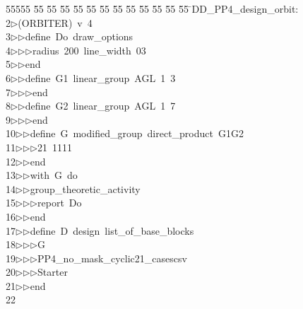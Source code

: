%
%
\begin{tabbing}
55555 \= 55 \= 55 \= 55 \= 55 \= 55 \= 55 \= 55 \= 55 \= 55 \= 55 \= 55 \= 55 \= \>DD\_PP4\_design\_orbit:\\[0pt]
2\>$\triangleright$\>(ORBITER)\ v\ 4\ \\[0pt]
3\>$\triangleright$\>$\triangleright$\>define\ Do\ draw\_options\ \\[0pt]
4\>$\triangleright$\>$\triangleright$\>$\triangleright$\>radius\ 200\ line\_width\ 03\ \\[0pt]
5\>$\triangleright$\>$\triangleright$\>end\ \\[0pt]
6\>$\triangleright$\>$\triangleright$\>define\ G1\ linear\_group\ AGL\ 1\ 3\ \\[0pt]
7\>$\triangleright$\>$\triangleright$\>$\triangleright$\>end\ \\[0pt]
8\>$\triangleright$\>$\triangleright$\>define\ G2\ linear\_group\ AGL\ 1\ 7\ \\[0pt]
9\>$\triangleright$\>$\triangleright$\>$\triangleright$\>end\ \\[0pt]
10\>$\triangleright$\>$\triangleright$\>define\ G\ modified\_group\ direct\_product\ G1G2\ \\[0pt]
11\>$\triangleright$\>$\triangleright$\>$\triangleright$\>21\ 1111\ \\[0pt]
12\>$\triangleright$\>$\triangleright$\>end\ \\[0pt]
13\>$\triangleright$\>$\triangleright$\>with\ G\ do\ \\[0pt]
14\>$\triangleright$\>$\triangleright$\>group\_theoretic\_activity\ \\[0pt]
15\>$\triangleright$\>$\triangleright$\>$\triangleright$\>report\ Do\ \\[0pt]
16\>$\triangleright$\>$\triangleright$\>end\ \\[0pt]
17\>$\triangleright$\>$\triangleright$\>define\ D\ design\ list\_of\_base\_blocks\ \\[0pt]
18\>$\triangleright$\>$\triangleright$\>$\triangleright$\>G\ \\[0pt]
19\>$\triangleright$\>$\triangleright$\>$\triangleright$\>PP4\_no\_mask\_cyclic21\_casescsv\ \\[0pt]
20\>$\triangleright$\>$\triangleright$\>$\triangleright$\>Starter\ \\[0pt]
21\>$\triangleright$\>$\triangleright$\>end\\[0pt]
22\>\end{tabbing}
